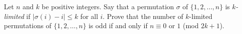 Let $n$ and $k$ be positive integers. Say that a permutation $\sigma$
of $\{1,2,\dots,n\}$ is \emph{$k$-limited} if $|\sigma(i) - i| \leq k$
for all $i$. Prove that the number of $k$-limited permutations of
$\{1,2,\dots,n\}$ is odd if and only if $n \equiv 0$ or $1$
(mod $2k+1$).
